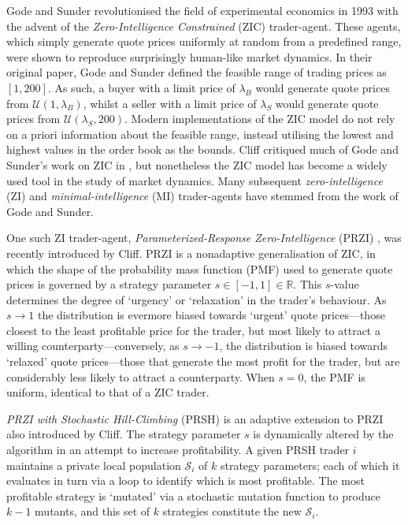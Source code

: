 \documentclass[conference]{IEEEtran}
\begin{document}
Gode and Sunder \cite{GodeSunder} revolutionised the field of experimental economics in 1993 with the advent of the \textit{Zero-Intelligence Constrained} (ZIC) trader-agent.
These agents, which simply generate quote prices uniformly at random from a predefined range, were shown to reproduce surprisingly human-like market dynamics.
In their original paper, Gode and Sunder defined the feasible range of trading prices as $[1,  200]$.
As such, a buyer with a limit price of $\lambda_B$ would generate quote prices from $\mathcal{U}(1, \lambda_B)$, whilst a seller with a limit price of $\lambda_S$ would generate quote prices from $\mathcal{U}(\lambda_S, 200)$.
Modern implementations of the ZIC model do not rely on a priori information about the feasible range, instead utilising the lowest and highest values in the order book as the bounds.
Cliff critiqued much of Gode and Sunder's work on ZIC in \cite{ZIP}, but nonetheless the ZIC model has become a widely used tool in the study of market dynamics.
Many subsequent \textit{zero-intelligence} (ZI) and \textit{minimal-intelligence} (MI) trader-agents have stemmed from the work of Gode and Sunder.

One such ZI trader-agent, \textit{Parameterized-Response Zero-Intelligence} (PRZI) \cite{PRZI}, was recently introduced by Cliff.
PRZI is a nonadaptive generalisation of ZIC, in which the shape of the probability mass function (PMF) used to generate quote prices is governed by a strategy parameter $s\in[-1, 1]\in\mathbb{R}$.
This $s$-value determines the degree of `urgency' or `relaxation' in the trader's behaviour.
As $s\to1$ the distribution is evermore biased towards `urgent' quote prices---those closest to the least profitable price for the trader, but most likely to attract a willing counterparty---conversely, as $s\to-1$, the distribution is biased towards `relaxed' quote prices---those that generate the most profit for the trader, but are considerably less likely to attract a counterparty.
When $s=0$, the PMF is uniform, identical to that of a ZIC trader.

\textit{PRZI with Stochastic Hill-Climbing} (PRSH) \cite{PRSH} is an adaptive extension to PRZI also introduced by Cliff.
The strategy parameter $s$ is dynamically altered by the algorithm in an attempt to increase profitability.
A given PRSH trader $i$ maintains a private local population $\mathcal{S}_i$ of $k$ strategy parameters; each of which it evaluates in turn via a loop to identify which is most profitable.
The most profitable strategy is `mutated' via a stochastic mutation function to produce $k-1$ mutants, and this set of $k$ strategies constitute the new $\mathcal{S}_i$.
\end{document}
